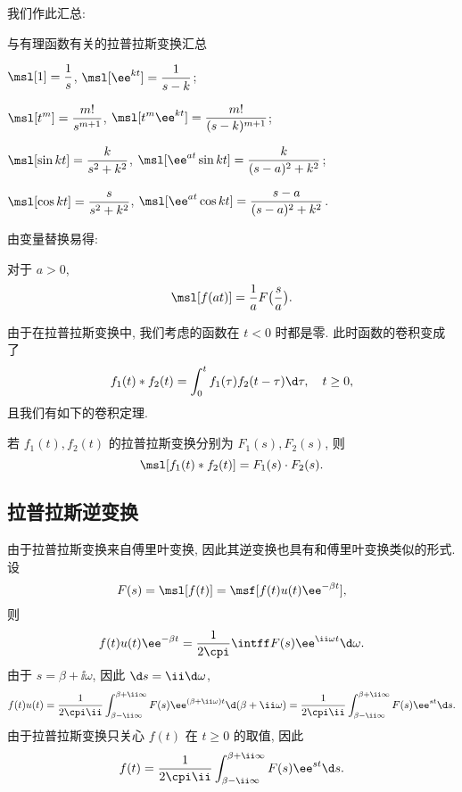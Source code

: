 我们作此汇总:
\begin{fifth}{与有理函数有关的拉普拉斯变换汇总}
  \label{page:rational-laplace-transform}
  \begin{enuma}
    \item $\displaystyle\msl[1]=\frac1s$, 
    $\displaystyle \msl[\ee^{kt}]=\frac1{s-k}$;
    \item $\displaystyle\msl[t^m]=\frac{m!}{s^{m+1}}$, 
    $\displaystyle\msl[t^m\ee^{kt}]=\frac{m!}{(s-k)^{m+1}}$;
    \item $\displaystyle\msl[\sin kt]=\frac{k}{s^2+k^2}$, 
    $\displaystyle\msl[\ee^{at}\sin kt]=\frac{k}{(s-a)^2+k^2}$;
    \item $\displaystyle\msl[\cos kt]=\frac{s}{s^2+k^2}$,
    $\displaystyle\msl[\ee^{at}\cos kt]=\frac{s-a}{(s-a)^2+k^2}$.
  \end{enuma}
\end{fifth}

由变量替换易得:
\begin{theorem}[相似性质]
  \label{thm:laplace-similar-property}
  对于 $a>0$, 
  \[
    \msl[f(at)]=\frac1a F\bigl(\frac sa\bigr).
  \]
\end{theorem}

由于在拉普拉斯变换中, 我们考虑的函数在 $t<0$ 时都是零.
此时函数的卷积变成了
\[
   f_1(t)\ast f_2(t)
  =\int_0^t f_1(\tau)f_2(t-\tau)\d \tau,\quad t\ge 0,
\]
且我们有如下的卷积定理.

\begin{theorem}[卷积定理]
  若 $f_1(t),f_2(t)$ 的拉普拉斯变换分别为 $F_1(s),F_2(s)$, 则
  \[
    \msl[f_1(t)\ast f_2(t)]=F_1(s)\cdot F_2(s).
  \]
\end{theorem}



\subsection{拉普拉斯逆变换}

由于拉普拉斯变换来自傅里叶变换, 因此其逆变换也具有和傅里叶变换类似的形式.
设
\[
   F(s)
  =\msl[f(t)]
  =\msf[f(t)u(t)\ee^{-\beta t}],
\]
则
\[
   f(t)u(t)\ee^{-\beta t}
  =\frac1{2\cpi}\intff F(s)\ee^{\ii \omega t}\d \omega.
\]
由于 $s=\beta+\ii\omega$, 因此 $\d s=\ii\d \omega$,
\[
   f(t)u(t)
  =\frac1{2\cpi\ii}\int_{\beta-\ii\infty}^{\beta+\ii\infty} F(s)\ee^{(\beta+\ii\omega)t}\d(\beta+\ii\omega)
  =\frac1{2\cpi\ii}\int_{\beta-\ii\infty}^{\beta+\ii\infty} F(s)\ee^{st}\d s.
\]
由于拉普拉斯变换只关心 $f(t)$ 在 $t\ge 0$ 的取值, 因此
\[
   f(t)
  =\frac1{2\cpi\ii}\int_{\beta-\ii\infty}^{\beta+\ii\infty} F(s)\ee^{st}\d s.
\]

